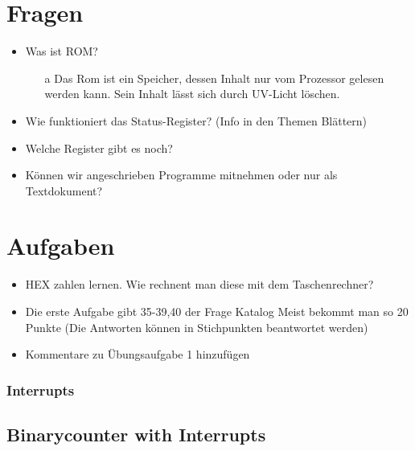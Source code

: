\documentclass[
  ngerman
  ,12pt
  ,pdftex
]{article}
\begin{document}
  \section{Fragen}
  \begin{itemize}
    \item Was ist ROM?
    \begin{itemize}
      \item [a] Das Rom ist ein Speicher, dessen Inhalt nur vom Prozessor gelesen werden kann. Sein Inhalt lässt sich durch UV-Licht löschen.
    \end{itemize}
    \item Wie funktioniert das Status-Register? (Info in den Themen Blättern)
    \item Welche Register gibt es noch?
    \item Können wir angeschrieben Programme mitnehmen oder nur als Textdokument?
  \end{itemize}
  \section{Aufgaben}
  \begin{itemize}
    \item HEX zahlen lernen. Wie rechnent man diese mit dem Taschenrechner?
    \item Die erste Aufgabe gibt 35-39,40 der Frage Katalog
    Meist bekommt man so 20 Punkte (Die Antworten können in Stichpunkten beantwortet werden)
    \item Kommentare zu Übungsaufgabe 1 hinzufügen
  \end{itemize}


\newpage





\newpage






\subsubsection*{Interrupts}

\subsection*{Binarycounter with Interrupts}

\end{document}
